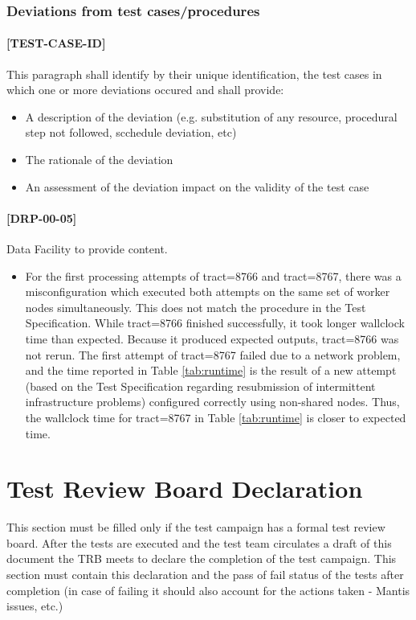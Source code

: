 \documentclass[DM,lsstdraft,STR,toc]{lsstdoc}
\begin{document}
\subsubsection{Deviations from test cases/procedures}
\paragraph{[TEST-CASE-ID]}
This paragraph shall identify by their unique identification, the test cases in which one or more deviations occured and shall provide:
\begin{itemize}
\item A description of the deviation (e.g. substitution of any resource, procedural step not followed, scchedule deviation, etc)
\item The rationale of the deviation
\item An assessment of the deviation impact on the validity of the test case
\end{itemize}

\paragraph{[DRP-00-05]} \label{sec:deviation-drp-00-05}
\begin{note}
Data Facility to provide content.
\end{note}
\begin{itemize}
  \item For the first processing attempts of tract=8766 and tract=8767,
	there was a misconfiguration which executed both attempts
	on the same set of worker nodes simultaneously. This does
	not match the procedure in the Test Specification.  While
	tract=8766 finished successfully, it took longer wallclock
	time than expected. Because it produced expected outputs,
	tract=8766 was not rerun.  The first attempt of tract=8767
	failed due to a network problem, and the time reported in
        Table \ref{tab:runtime} is the result of a new attempt
	(based on the Test Specification regarding resubmission of
	intermittent infrastructure problems) configured correctly
	using non-shared nodes.  Thus, the wallclock time for
	tract=8767 in Table \ref{tab:runtime} is closer to expected
	time.
\end{itemize}

\newpage

\section{Test Review Board Declaration\label{sect:trb}}
This section must be filled only if the test campaign has a  formal
test review board.
After the tests are executed and the test team circulates a draft of
this document the TRB meets to declare the completion of the test campaign.
This section must contain this declaration and the pass of fail status
of the tests after completion (in case of failing it should also account
for the actions taken - Mantis issues, etc.)
\end{document}
